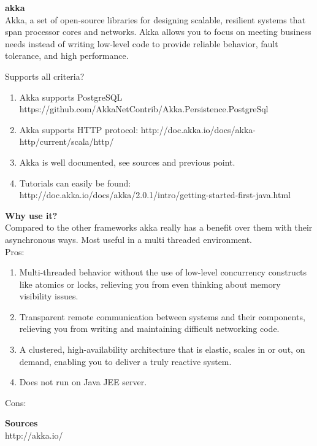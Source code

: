 
		\textbf{akka} \\
		 Akka, a set of open-source libraries for designing scalable, resilient systems that span processor cores and networks. Akka allows you to focus on meeting business needs instead of writing low-level code to provide reliable behavior, fault tolerance, and high performance.
		
		Supports all criteria?\\
		\begin{enumerate}
			\item Akka supports PostgreSQL https://github.com/AkkaNetContrib/Akka.Persistence.PostgreSql
			\item Akka supports HTTP protocol: http://doc.akka.io/docs/akka-http/current/scala/http/
			\item Akka is well documented, see sources and previous point.
			\item Tutorials can easily be found: http://doc.akka.io/docs/akka/2.0.1/intro/getting-started-first-java.html
		\end{enumerate}
		
	 	\textbf{Why use it?} \\
		Compared to the other frameworks akka really has a benefit over them with their asynchronous ways. Most useful in a multi threaded environment.\\
		
		Pros:
		\begin{enumerate}
			\item Multi-threaded behavior without the use of low-level concurrency constructs like atomics or locks, relieving you from even thinking about memory visibility issues.
			\item Transparent remote communication between systems and their components, relieving you from writing and maintaining difficult networking code.
			\item A clustered, high-availability architecture that is elastic, scales in or out, on demand, enabling you to deliver a truly reactive system.
			\item Does not run on Java JEE server.
		\end{enumerate}
		Cons:

	\textbf{Sources}\\
	http://akka.io/